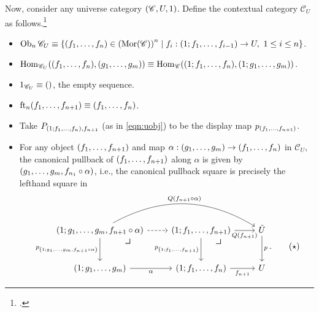 \documentclass[10pt,letterpaper,cm]{nupset}
\theoremstyle{definition}
\theoremstyle{theorem}
\theoremstyle{remark}
\DeclareMathOperator{\ft}{ft}
\DeclareMathOperator{\ob}{Ob}
\DeclareMathOperator{\mor}{Mor}
\newcommand{\0}{\mathbf{0}}
\newcommand{\1}{\mathbf{1}}
\newcommand{\2}{\mathbf{2}}
\renewcommand{\c}{\mathscr{C}}
\DeclareMathOperator{\Hom}{Hom}
\newcommand{\bi}{\begin{itemize}}
\newcommand{\ei}{\end{itemize}}
\begin{document}
Now, consider any universe category $\mleft(\c, U, 1\mright)$. Define the contextual category $\c_U$ as follows.\label{indcxtcat}\footnote{\cite[Definition 1.3.2]{KL}.}
\bi
\item $\ob_n{\c_U} \equiv \mleft\{\mleft(f_1, \ldots, f_n\mright) \in \mleft(\mor(\c)\mright)^n \mid f_i : \mleft(1; f_1, \ldots, f_{i-1}\mright) \to U, \ 1 \leq i \leq n \mright\}$.
\item $\Hom_{\c_{U}}\mleft(\mleft(f_1, \ldots, f_n\mright), \mleft(g_1, \ldots, g_m\mright)\mright) \equiv \Hom_{\c}\mleft(\mleft(1; f_1, \ldots, f_n\mright), \mleft(1; g_1, \ldots, g_m\mright)    \mright)$.
\item $1_{\c_U}\equiv \mleft({}\mright)$, the empty sequence.
\item $\ft_n(f_1, \ldots, f_{n+1}) \equiv \mleft(f_1, \ldots, f_n\mright)$.
\item Take $P_{\mleft(1; f_1, \ldots, f_n\mright), f_{n+1}}$ (as in \eqref{eqn:uobj}) to be the display map $p_{\mleft(f_1, \ldots, f_{n+1}\mright)}$.
\item For any object $\mleft(f_1, \ldots, f_{n+1}\mright)$ and map $\alpha : \mleft(g_1, \ldots, g_m\mright) \to \mleft(f_1, \ldots, f_n\mright)$ in $\c_{U}$, the canonical pullback of $\mleft(f_1, \ldots, f_{n+1}\mright)$ along $\alpha$ is given by $\mleft(g_1, \ldots, g_m, f_{n_1}\circ \alpha \mright)$, i.e., the canonical pullback square is precisely the lefthand square in
\[
\label{eqn:CU} \begin{tikzcd}[row sep=large]
{\mleft(1; g_1, \ldots, g_m, f_{n+1} \circ \alpha\mright)} \arrow[rr, "Q(f_{n+1}\circ \alpha)", bend left] \arrow[r, dashed] \arrow[d, "{p_{\mleft(1; g_1, \ldots, g_m, f_{n+1} \circ \alpha\mright)}}"']  \arrow[dr, phantom, "\scalebox{1.5}{\color{black}$\lrcorner$}", very near start] & {\mleft(1; f_1, \ldots, f_{n+1}\mright)} \arrow[r, "Q(f_{n+1})"'] \arrow[d, "{p_{\mleft(1; f_1, \ldots, f_{n+1}\mright)}}"']  \arrow[dr, phantom, "\scalebox{1.5}{\color{black}$\lrcorner$}", very near start] & \tilde{U} \arrow[d, "p"] \\
{\mleft(1; g_1, \ldots, g_m\mright)} \arrow[r, "\alpha"']                                                                                                                                               & {\mleft(1; f_1, \ldots, f_{n}\mright)} \arrow[r, "f_{n+1}"']                                                              & U                       
\end{tikzcd}. \tag{$\star$}
\]
\ei
\end{document}
